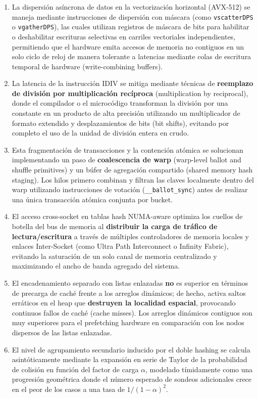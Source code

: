 \documentclass[12pt,a4paper]{report}
\begin{document}
\begin{enumerate}
    \item La dispersión asíncrona de datos en la vectorización horizontal (AVX-512) se maneja mediante instrucciones de dispersión con máscara (como \texttt{vscatterDPS} o \texttt{vgatherDPS}), las cuales utilizan registros de máscara de bits para habilitar o deshabilitar escrituras selectivas en carriles vectoriales independientes, permitiendo que el hardware emita accesos de memoria no contiguos en un solo ciclo de reloj de manera tolerante a latencias mediante colas de escritura temporal de hardware (write-combining buffers).
    \item La latencia de la instrucción IDIV se mitiga mediante técnicas de \textbf{reemplazo de división por multiplicación recíproca} (multiplication by reciprocal), donde el compilador o el microcódigo transforman la división por una constante en un producto de alta precisión utilizando un multiplicador de formato extendido y desplazamientos de bits (bit shifts), evitando por completo el uso de la unidad de división entera en crudo.
    \item Esta fragmentación de transacciones y la contención atómica se solucionan implementando un paso de \textbf{coalescencia de warp} (warp-level ballot and shuffle primitives) y un búfer de agregación compartido (shared memory hash staging). Los hilos primero combinan y filtran las claves localmente dentro del warp utilizando instrucciones de votación (\texttt{\_\_ballot\_sync}) antes de realizar una única transacción atómica conjunta por bucket.
    \item El acceso cross-socket en tablas hash NUMA-aware optimiza los cuellos de botella del bus de memoria al \textbf{distribuir la carga de tráfico de lectura/escritura} a través de múltiples controladores de memoria locales y enlaces Inter-Socket (como Ultra Path Interconnect o Infinity Fabric), evitando la saturación de un solo canal de memoria centralizado y maximizando el ancho de banda agregado del sistema.
    \item El encadenamiento separado con listas enlazadas \textbf{no} es superior en términos de precarga de caché frente a los arreglos dinámicos; de hecho, activa saltos erráticos en el heap que \textbf{destruyen la localidad espacial}, provocando continuos fallos de caché (cache misses). Los arreglos dinámicos contiguos son muy superiores para el prefetching hardware en comparación con los nodos dispersos de las listas enlazadas.
    \item El nivel de agrupamiento secundario inducido por el doble hashing se calcula asintóticamente mediante la expansión en serie de Taylor de la probabilidad de colisión en función del factor de carga $\alpha$, modelado tímidamente como una progresión geométrica donde el número esperado de sondeos adicionales crece en el peor de los casos a una tasa de $1 / (1 - \alpha)^2$.

\end{enumerate}
\end{document}
